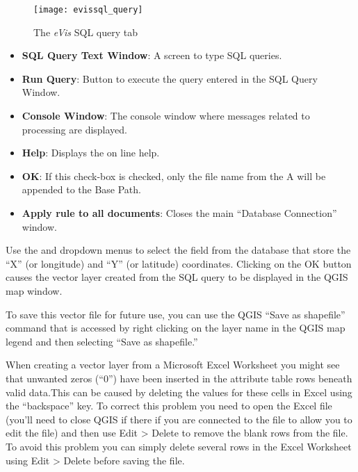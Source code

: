 \begin{figure}[ht]
   \centering
   \texttt{[image: evissql\_query]}
   \caption{\label{evissql_query}The \emph{eVis} SQL query tab \wincaption}
\end{figure}

\begin{itemize}[label=--]
\item \textbf{SQL Query Text Window}: A screen to type SQL queries.
\item \textbf{Run Query}: Button to execute the query entered in the SQL Query Window.
\item \textbf{Console Window}: The console window where messages related to processing are
displayed.
\item \textbf{Help}: Displays the on line help.
\item \textbf{OK}: If this check-box is checked, only the file name from the A will be appended to
the Base Path.
\item \textbf{Apply rule to all documents}: Closes the main ``Database Connection'' window.
\end{itemize}

Use the  and  dropdown menus to select the field
from the database that store the ``X'' (or longitude) and ``Y'' (or latitude) coordinates. Clicking
on the OK button causes the vector layer created from the SQL query to be displayed in the QGIS map
window.

To save this vector file for future use, you can use the QGIS ``Save as shapefile'' command that is
accessed by right clicking on the layer name in the QGIS map legend and then selecting ``Save as
shapefile.''

\begin{Tip}\caption{\textsc{Creating a vector layer from a Microsoft Excel Worksheet}}
When creating a vector layer from a Microsoft Excel Worksheet you might see that unwanted
zeros (``0'') have been inserted in the attribute table rows beneath valid data.This can be caused
by deleting the values for these cells in Excel using the ``backspace'' key. To correct this problem
you need to open the Excel file (you'll need to close QGIS if there if you are connected to the file
to allow you to edit the file) and then use Edit > Delete to remove the blank rows from the file. To
avoid this problem you can simply delete several rows in the Excel Worksheet using Edit > Delete
before saving the file.
\end{Tip}

